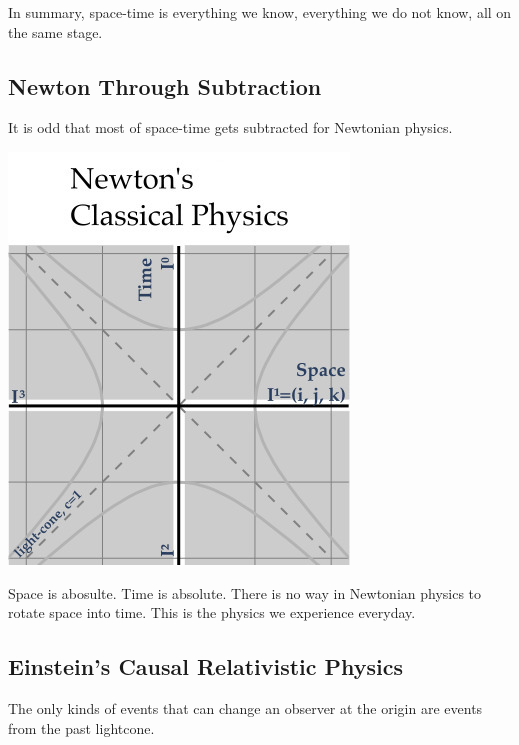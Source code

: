 In summary, space-time is everything we know, everything we do not know,
all on the same stage.

\hypertarget{newton-through-subtraction}{%
\subsection{Newton Through
Subtraction}\label{newton-through-subtraction}}

It is odd that most of space-time gets subtracted for Newtonian physics.

\includegraphics{../images/QM/BellsFuture/Bells_future_QM_Newton.jpg}

Space is abosulte. Time is absolute. There is no way in Newtonian
physics to rotate space into time. This is the physics we experience
everyday.

\hypertarget{einsteins-causal-relativistic-physics}{%
\subsection{Einstein's Causal Relativistic
Physics}\label{einsteins-causal-relativistic-physics}}

The only kinds of events that can change an observer at the origin are
events from the past lightcone.

